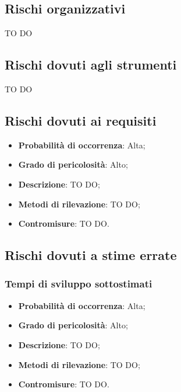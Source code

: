 	
	\subsection{Rischi organizzativi} %
	\label{sub:rischi_organizzativi}
	TO DO
	
	
	
	\subsection{Rischi dovuti agli strumenti} %
	\label{sub:rischi_dovuti_agli_strumenti}
	TO DO
	
	
	
	\subsection{Rischi dovuti ai requisiti} %
	\label{sub:rischi_dovuti_ai_requisiti}
		\begin{itemize}
			\item \textbf{Probabilità di occorrenza}: Alta;
			\item \textbf{Grado di pericolosità}: Alto;
			\item \textbf{Descrizione}: TO DO;
			\item \textbf{Metodi di rilevazione}: TO DO;
			\item \textbf{Contromisure}: TO DO.
		\end{itemize}
	
	
	
	\subsection{Rischi dovuti a stime errate} %
	\label{sub:rischi_dovuti_a_stime_errate}
		\subsubsection{Tempi di sviluppo sottostimati} %
		\label{ssub:tempi_di_sviluppo_sottostimati}
			\begin{itemize}
				\item \textbf{Probabilità di occorrenza}: Alta;
				\item \textbf{Grado di pericolosità}: Alto;
				\item \textbf{Descrizione}: TO DO;
				\item \textbf{Metodi di rilevazione}: TO DO;
				\item \textbf{Contromisure}: TO DO.
			\end{itemize}
		
